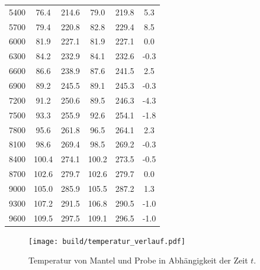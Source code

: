 \begin{table}
\begin{tabular}{c c c c c c}
  5400	&	76.4	&	214.6	&	79.0	&	219.8	&	5.3   \\
  5700	&	79.4	&	220.8	&	82.8	&	229.4	&	8.5   \\
  6000	&	81.9	&	227.1	&	81.9	&	227.1	&	0.0   \\
  6300	&	84.2	&	232.9	&	84.1	&	232.6	&	-0.3   \\
  6600	&	86.6	&	238.9	&	87.6	&	241.5	&	2.5   \\
  6900	&	89.2	&	245.5	&	89.1	&	245.3	&	-0.3   \\
  7200	&	91.2	&	250.6	&	89.5	&	246.3	&	-4.3   \\
  7500	&	93.3	&	255.9	&	92.6	&	254.1	&	-1.8   \\
  7800	&	95.6	&	261.8	&	96.5	&	264.1	&	2.3   \\
  8100	&	98.6	&	269.4	&	98.5	&	269.2	&	-0.3   \\
  8400	&	100.4	&	274.1	&	100.2	&	273.5	&	-0.5   \\
  8700	&	102.6	&	279.7	&	102.6	&	279.7	&	0.0   \\
  9000	&	105.0	&	285.9	&	105.5	&	287.2	&	1.3   \\
  9300	&	107.2	&	291.5	&	106.8	&	290.5	&	-1.0   \\
  9600	&	109.5	&	297.5	&	109.1	&	296.5	&	-1.0   \\
  \bottomrule
\end{tabular}
\end{table}

\begin{figure}
  \centering
  \texttt{[image: build/temperatur\_verlauf.pdf]}
  \caption{Temperatur von Mantel und Probe in Abhängigkeit der Zeit $t$.}
  \label{fig:T_mess}
\end{figure}


